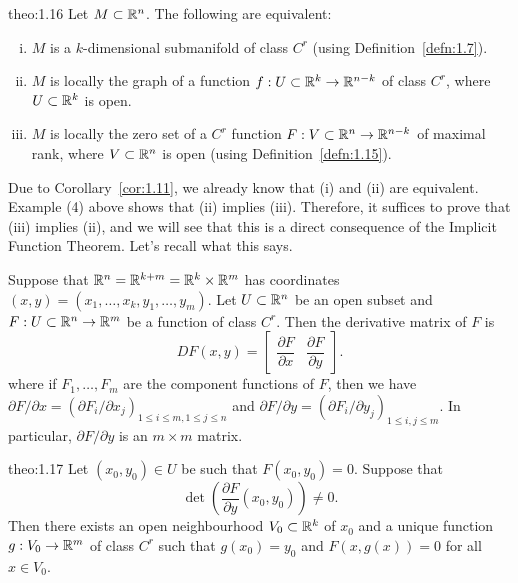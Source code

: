 \begin{theo}{theo:1.16}
    Let $M \subset \mathbb{R}^n$. The following are equivalent: 
    \begin{enumerate}[(i)]
        \item $M$ is a $k$-dimensional submanifold of class $C^r$ (using Definition~\ref{defn:1.7}).
        \item $M$ is locally the graph of a function $f : U \subset \mathbb{R}^k \to \mathbb{R}^{n-k}$ 
        of class $C^r$, where $U \subset \mathbb{R}^k$ is open. 
        \item $M$ is locally the zero set of a $C^r$ function $F : V \subset \mathbb{R}^n 
        \to \mathbb{R}^{n-k}$ of maximal rank, where $V \subset \mathbb{R}^n$ is open 
        (using Definition~\ref{defn:1.15}).
    \end{enumerate}
\end{theo}\vspace{-0.25cm}

Due to Corollary~\ref{cor:1.11}, we already know that (i) and (ii) are 
equivalent. Example (4) above shows that (ii) implies (iii). Therefore, 
it suffices to prove that (iii) implies (ii), and we will see that this is a 
direct consequence of the Implicit Function Theorem. Let's recall what this says.

Suppose that $\mathbb{R}^n = \mathbb{R}^{k+m} = \mathbb{R}^k \times \mathbb{R}^m$ has coordinates $(x, y) 
= (x_1, \dots, x_k, y_1, \dots, y_m)$. Let $U \subset \mathbb{R}^n$ be an open subset 
and $F : U \subset \mathbb{R}^n \to \mathbb{R}^m$ be a function of class $C^r$. Then the 
derivative matrix of $F$ is 
\[ DF(x, y) = \left[ \begin{array}{c|c} 
    \dfrac{\partial F}{\partial x} & \dfrac{\partial F}{\partial y} 
\end{array} \right]. \]
where if $F_1, \dots, F_m$ are the component functions of $F$, 
then we have $\partial F/\partial x = (\partial F_i/\partial x_j)_{1\leq i\leq m, 
1\leq j\leq n}$ and $\partial F/\partial y = 
(\partial F_i/\partial y_j)_{1\leq i, j\leq m}$. In particular, 
$\partial F/\partial y$ is an $m \times m$ matrix.

\begin{theo}{theo:1.17}
    Let $(x_0, y_0) \in U$ be such that $F(x_0, y_0) = 0$. Suppose that 
    \[ \det\left( \frac{\partial F}{\partial y}(x_0, y_0) \right) \neq 0. \] 
    Then there exists an open neighbourhood $V_0 \subset \mathbb{R}^k$ of $x_0$ 
    and a unique function $g : V_0 \to \mathbb{R}^m$ of class $C^r$ such that 
    $g(x_0) = y_0$ and $F(x, g(x)) = 0$ for all $x \in V_0$. 
\end{theo}\vspace{-0.25cm}

